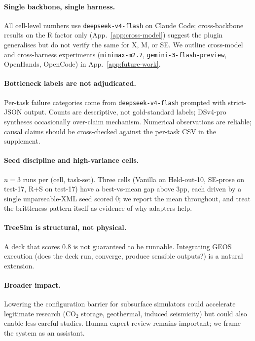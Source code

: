\documentclass{article}
\begin{document}
\paragraph{Single backbone, single harness.}
All cell-level numbers use \texttt{deepseek-v4-flash} on Claude Code; cross-backbone results on the R factor only (App.~\ref{app:cross-model}) suggest the plugin generalises but do not verify the same for X, M, or SE. We outline cross-model and cross-harness experiments (\texttt{minimax-m2.7}, \texttt{gemini-3-flash-preview}, OpenHands, OpenCode) in App.~\ref{app:future-work}.

\paragraph{Bottleneck labels are not adjudicated.}
Per-task failure categories come from \texttt{deepseek-v4-flash} prompted with strict-JSON output. Counts are descriptive, not gold-standard labels; DSv4-pro syntheses occasionally over-claim mechanism. Numerical observations are reliable; causal claims should be cross-checked against the per-task CSV in the supplement.

\paragraph{Seed discipline and high-variance cells.}
$n=3$ runs per (cell, task-set). Three cells (Vanilla on Held-out-10, SE-prose on test-17, R+S on test-17) have a best-vs-mean gap above 3pp, each driven by a single unparseable-XML seed scored 0; we report the mean throughout, and treat the brittleness pattern itself as evidence of why adapters help.

\paragraph{TreeSim is structural, not physical.}
A deck that scores 0.8 is not guaranteed to be runnable. Integrating GEOS execution (does the deck run, converge, produce sensible outputs?) is a natural extension.

\paragraph{Broader impact.}
Lowering the configuration barrier for subsurface simulators could accelerate legitimate research (CO$_2$ storage, geothermal, induced seismicity) but could also enable less careful studies. Human expert review remains important; we frame the system as an assistant.
\end{document}
